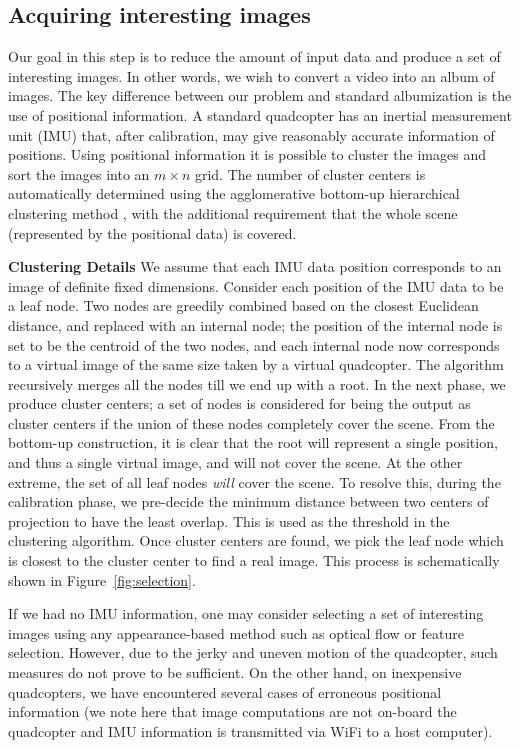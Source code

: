\subsection{Acquiring interesting images}
\label{sec:selection}
Our goal in this step is to reduce the amount of input data and
produce a set of interesting images.  In other words, we wish to
convert a video into an album of images.  The key difference between
our problem and standard albumization \cite{Aner, Lee} is the use of
positional information.  A standard quadcopter has an inertial
measurement unit (IMU) that, after calibration, may give reasonably
accurate information of positions. Using positional information it is
possible to cluster the images and sort the images into an $m\times
n$ grid.  The number of cluster centers is automatically determined
using the agglomerative bottom-up hierarchical clustering method
\cite{Lior}, with the additional requirement that the whole scene
(represented by the positional data) is covered.

{\bf Clustering Details} We assume that each IMU data position
corresponds to an image of definite fixed dimensions.  Consider each
position of the IMU data to be a leaf node. Two nodes are greedily
combined based on the closest Euclidean distance, and replaced with an
internal node; the position of the internal node is set to be the
centroid of the two nodes, and each internal node now corresponds to a
virtual image of the same size taken by a virtual quadcopter.  The
algorithm recursively merges all the nodes till we end up with a root.
In the next phase, we produce cluster centers; a set of nodes is
considered for being the output as cluster centers if the union of
these nodes completely cover the scene. From the bottom-up
construction, it is clear that the root will represent a single
position, and thus a single virtual image, and will not cover the
scene.  At the other extreme, the set of all leaf nodes \emph{will}
cover the scene. To resolve this, during the calibration phase, we
pre-decide the minimum distance between two centers of projection to
have the least overlap. This is used as the threshold in the clustering
algorithm.  Once cluster centers are found, we pick the leaf node
which is closest to the cluster center to find a real image. This
process is schematically shown in Figure~\ref{fig:selection}.

If we had no IMU information, one may consider selecting a
set of interesting images using any appearance-based method such as
optical flow or feature selection.  However, due to the jerky and
uneven motion of the quadcopter, such measures do not prove to be
sufficient. On the other hand, on inexpensive quadcopters, we have
encountered several cases of erroneous positional information (we note
here that image computations are not on-board the quadcopter and IMU
information is transmitted via WiFi to a host computer).  

